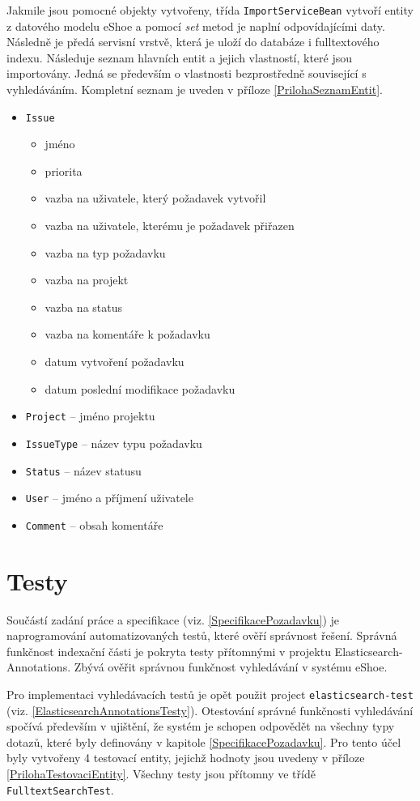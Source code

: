 \documentclass[11pt,oneside]{fithesis2}
\begin{document}
Jakmile jsou pomocné objekty vytvořeny, třída \texttt{ImportServiceBean} vytvoří entity z datového modelu eShoe a pomocí \emph{set} metod je naplní odpovídajícími daty. Následně je předá servisní vrstvě, která je uloží do databáze i fulltextového indexu. 
Následuje seznam hlavních entit a jejich vlastností, které jsou importovány. Jedná se především o vlastnosti bezprostředně související s vyhledáváním. Kompletní seznam je uveden v příloze \ref{PrilohaSeznamEntit}.
\begin{itemize}
	\item \texttt{Issue}
		\begin{itemize}
			\item jméno
			\item priorita
			\item vazba na uživatele, který požadavek vytvořil
			\item vazba na uživatele, kterému je požadavek přiřazen
			\item vazba na typ požadavku
			\item vazba na projekt			
			\item vazba na status
			\item vazba na komentáře k požadavku
			\item datum vytvoření požadavku
			\item datum poslední modifikace požadavku
		\end{itemize}
	\item \texttt{Project} -- jméno projektu
	\item \texttt{IssueType} -- název typu požadavku
	\item \texttt{Status} -- název statusu
	\item \texttt{User} -- jméno a příjmení uživatele
	\item \texttt{Comment} -- obsah komentáře
\end{itemize}

\section{Testy}
Součástí zadání práce a specifikace (viz. \ref{SpecifikacePozadavku}) je naprogramování automatizovaných testů, které ověří správnost řešení. Správná funkčnost indexační části je pokryta testy přítomnými v projektu Elasticsearch-Annotations. Zbývá ověřit správnou funkčnost vyhledávání v systému eShoe.

Pro implementaci vyhledávacích testů je opět použit project \texttt{elasticsearch-test} (viz. \ref{ElasticsearchAnnotationsTesty}). Otestování správné funkčnosti vyhledávání spočívá především v ujištění, že systém je schopen odpovědět na všechny typy dotazů, které byly definovány v kapitole \ref{SpecifikacePozadavku}. Pro tento účel byly vytvořeny 4 testovací entity, jejichž hodnoty jsou uvedeny v příloze \ref{PrilohaTestovaciEntity}. Všechny testy jsou přítomny ve třídě \texttt{FulltextSearchTest}. 
\end{document}
